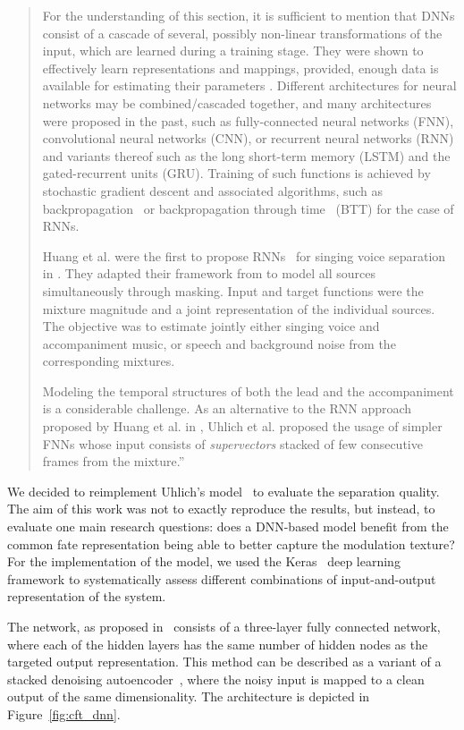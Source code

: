 \begin{quote}
For the understanding of this section, it is sufficient to mention that DNNs consist of a cascade of several, possibly non-linear transformations of the input, which are learned during a training stage.
They were shown to effectively learn representations and mappings, provided, enough data is available for estimating their parameters \cite{deng14, lecun15, goodfellow16}.
Different architectures for neural networks may be combined/cascaded together, and many architectures were proposed in the past, such as fully-connected neural networks (FNN), convolutional neural networks (CNN), or recurrent neural networks (RNN) and variants thereof such as the long short-term memory (LSTM) and the gated-recurrent units (GRU).
Training of such functions is achieved by stochastic gradient descent \cite{robbins51} and associated algorithms, such as backpropagation~\cite{rumelhart862} or backpropagation through time~\cite{rumelhart86} (BTT) for the case of RNNs.
\par
Huang et al. were the first to propose RNNs~\cite{hermans13,pascanu14} for singing voice separation in \cite{huang14,huang15}. They adapted their framework from \cite{huang142} to model all sources simultaneously through masking. Input and target functions were the mixture magnitude and a joint representation of the individual sources. The objective was to estimate jointly either singing voice and accompaniment music, or speech and background noise from the corresponding mixtures.
\par
Modeling the temporal structures of both the lead and the accompaniment is a considerable challenge. As an alternative to the RNN approach proposed by Huang et al. in \cite{huang14}, Uhlich et al. proposed the usage of simpler FNNs \cite{uhlich15} whose input consists of \textit{supervectors} stacked of few consecutive frames from the mixture.''
\end{quote}
We decided to reimplement Uhlich's model~\cite{uhlich15} to evaluate the separation quality.
The aim of this work was not to exactly reproduce the results, but instead, to evaluate one main research questions: does a DNN-based model benefit from the common fate representation being able to better capture the modulation texture?
For the implementation of the model, we used the Keras~\cite{chollet15} deep learning framework to systematically assess different combinations of input-and-output representation of the system.

\par
The network, as proposed in~\cite{uhlich15} consists of a three-layer fully connected network, where each of the hidden layers has the same number of hidden nodes as the targeted output representation.
This method can be described as a variant of a stacked denoising autoencoder~\cite{pvincent08}, where the noisy input is mapped to a clean output of the same dimensionality.
The architecture is depicted in Figure~\ref{fig:cft_dnn}. 

